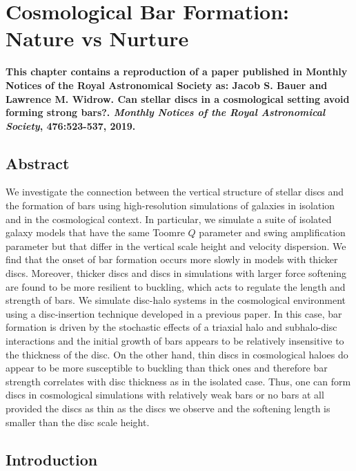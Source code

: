 \chapter{Cosmological Bar Formation: Nature vs Nurture} \label{ch:paper_ii}

\textbf{This chapter contains a reproduction of a paper published in  Monthly Notices of the
Royal Astronomical Society as: Jacob S. Bauer and Lawrence M. Widrow. Can stellar discs in a cosmological setting avoid forming strong bars?. \textit{Monthly Notices of the Royal Astronomical Society}, 476:523-537,
2019. }

\newpage%
\section{Abstract}

We investigate the connection between the vertical structure of
stellar discs and the formation of bars using high-resolution
simulations of galaxies in isolation and in the cosmological context.
In particular, we simulate a suite of isolated galaxy models that have
the same Toomre $Q$ parameter and swing amplification parameter but
that differ in the vertical scale height and velocity dispersion.  We
find that the onset of bar formation occurs more slowly in models with
thicker discs.  Moreover, thicker discs and discs in
simulations with larger force softening are found to be more
resilient to buckling, which acts to regulate the length and strength
of bars.  We  simulate disc-halo systems in the cosmological
environment using a disc-insertion technique developed in a previous
paper.  In this case, bar formation is driven by the stochastic
effects of a triaxial halo and subhalo-disc interactions and the
initial growth of bars appears to be relatively insensitive to the
thickness of the disc.  On the other hand, thin discs in cosmological
haloes do appear to be more susceptible to buckling than thick ones and
therefore bar strength correlates with disc thickness as in the
isolated case.  Thus, one can form discs in cosmological
simulations with relatively weak bars or no bars at all provided the
discs as thin as the discs we observe and the softening length is
smaller than the disc scale height.



\section{Introduction}

